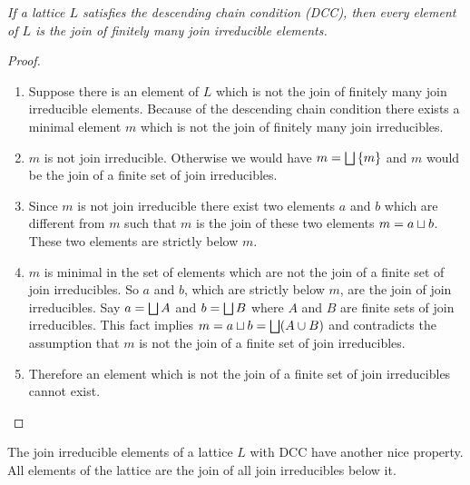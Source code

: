 \begin{theorem}
    \label{thmDCCJoinIrreducible}
    \emph{If a lattice $L$ satisfies the descending chain condition (DCC), then
    every element of $L$ is the join of finitely many join irreducible
    elements.}

    \begin{proof}
        \begin{enumerate}
            \item Suppose there is an element of $L$ which is not the join of
                finitely many join irreducible elements. Because of the
                descending chain condition there exists a minimal element $m$
                which is not the join of finitely many join irreducibles.

            \item $m$ is not join irreducible. Otherwise we would have $m =
                \bigsqcup \left\{m\right\}$ and $m$ would be the join of a finite set of
                join irreducibles.

            \item Since $m$ is not join irreducible there exist two elements $a$
                and $b$ which are different from $m$ such that $m$ is the join
                of these two elements $m = a \sqcup b$. These two elements are
                strictly below $m$.

            \item $m$ is minimal in the set of elements which are not the join
                of a finite set of join irreducibles. So $a$ and $b$, which are
                strictly below $m$, are the join of join irreducibles. Say $a =
                \bigsqcup A$ and $b = \bigsqcup B$ where $A$ and $B$ are finite
                sets of join irreducibles. This fact implies $m = a \sqcup b =
                \bigsqcup (A \cup B)$ and contradicts the assumption that $m$
                is not the join of a finite set of join irreducibles.

            \item Therefore an element which is not the join of a finite set of
                join irreducibles cannot exist.
        \end{enumerate}
    \end{proof}
\end{theorem}


The join irreducible elements of a lattice $L$ with DCC have another nice
property. All elements of the lattice are the join of all join irreducibles
below it.

